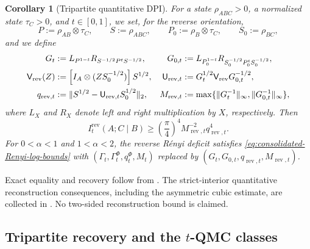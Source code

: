 \documentclass[11pt]{article}
\newtheorem{corollary}[corollary]{Corollary}
\theoremstyle{remark}
\DeclareMathOperator{\rev}{rev}
\newcommand{\1}{\mathbbm{1}}
\begin{document}
\begin{corollary}[Tripartite quantitative DPI]
\label{cor:consolidated-tripartite-dpi}
For a state $\rho_{ABC}>0$, a normalized state $\tau_C>0$, and
$t\in[0,1]$, we set, for the reverse orientation,
\begin{equation}
 P:=\rho_{AB}\otimes\tau_C,\qquad S:=\rho_{ABC},\qquad
 P_0:=\rho_B\otimes\tau_C,\qquad S_0:=\rho_{BC},
\end{equation}
and we define
\begin{align}
 G_t&:=L_{P^{1-t}}R_{S^{-1/2}P^tS^{-1/2}},&
 G_{0,t}&:=L_{P_0^{1-t}}R_{S_0^{-1/2}P_0^tS_0^{-1/2}},\notag\\
 \mathsf V_{\rev}(Z)
 &:=\left[I_A\otimes(ZS_0^{-1/2})\right]S^{1/2},&
 \mathsf U_{\rev,t}
 &:=G_t^{1/2}\mathsf V_{\rev}G_{0,t}^{-1/2},\notag\\
 q_{\rev,t}
 &:=\lVert S^{1/2}-\mathsf U_{\rev,t}S_0^{1/2}\rVert_2,&
 M_{\rev,t}
 &:=\max\{\lVert G_t^{-1}\rVert_\infty,
                 \lVert G_{0,t}^{-1}\rVert_\infty\},
 \label{eq:consolidated-reverse-data}
\end{align}
where $L_X$ and $R_X$ denote left and right multiplication by $X$,
respectively.  Then
\begin{equation}
 I_t^{\rev}(A;C\mid B)
 \geq\left(\frac\pi4\right)^4
 M_{\rev,t}^{-2}q_{\rev,t}^4.
 \label{eq:consolidated-reverse-q-bound}
\end{equation}
For $0<\alpha<1$ and $1<\alpha<2$, the reverse R\'enyi deficit
satisfies \eqref{eq:consolidated-Renyi-log-bounds} with
$(\Gamma_t,\Gamma_t^\Phi,q_t^\Phi,M_t)$ replaced by
$(G_t,G_{0,t},q_{\rev,t},M_{\rev,t})$.
\end{corollary}

Exact equality and recovery follow from
.  The strict-interior quantitative
reconstruction consequences, including the asymmetric cubic estimate,
are collected in
.  No two-sided
reconstruction bound is claimed.

\subsection{Tripartite recovery and the
\texorpdfstring{$t$-QMC}{t-QMC} classes}
\end{document}
